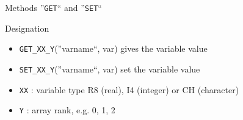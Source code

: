\begin{frame}{Methods ''\texttt{GET}`` and ''\texttt{SET}``}

  \begin{block}{Designation}
    \begin{itemize}
    \item \texttt{GET{\_}XX{\_}Y}(''varname``, var) gives the variable value
    \item \texttt{SET{\_}XX{\_}Y}(''varname``, var) set the variable value
    \end{itemize}
  \end{block}


  \begin{block}{}
    \begin{itemize}
    \item \texttt{XX}       : variable type R8 (real), I4 (integer) or CH (character)
    \item \texttt{Y}        : array rank, e.g. 0, 1, 2
    \end{itemize}
  \end{block}

\end{frame}

